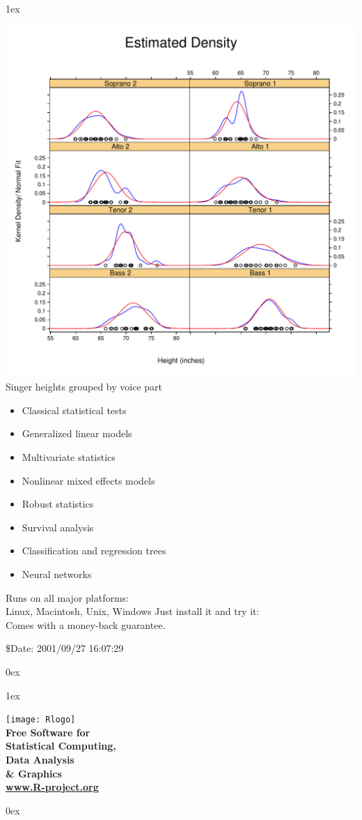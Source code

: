 \documentclass[landscape]{article}
\newlength{\colw}
\newcommand{\column}[1]{\hspace*{9mm}{}
  \parbox[t][0.99\textheight][t]{\colw}{\parskip1ex
    #1\parskip0ex}\hspace{9mm}{}}
\begin{document}
\column{
  \begin{center}
    \footnotesize\sf
    \includegraphics[width=\colw]{lattice-density}
    Singer heights grouped by voice part
  \end{center}

  \vfill
  \flushleft
  \begin{itemize}
   \item Classical statistical tests
   \item Generalized linear models
   \item Multivariate statistics
   \item Nonlinear mixed effects models
   \item Robust statistics
   \item Survival analysis
   \item Classification and regression trees
   \item Neural networks
  \end{itemize}
  \vfill
  Runs on all major platforms:\\
  Linux, Macintosh, Unix, Windows
  \vfill
  Just install it and try it:\\  Comes with a money-back guarantee.

  \begin{flushright}\tiny
    \$Date: 2001/09/27 16:07:29 $\ $
  \end{flushright}
}
\column{
    \vfill
  \begin{center}
    \texttt{[image: Rlogo]}\\[2cm]
    \bf
    \Large
    Free Software for\\[1cm]
    \Huge
    Statistical Computing,\\ Data Analysis\\ \& Graphics\\[1cm]
    \Large
    \url{www.R-project.org}
  \end{center}
  \vfill
  }
\end{document}
